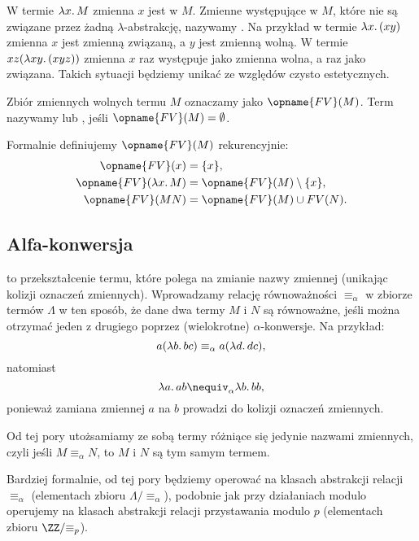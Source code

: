 \documentclass[polish,pretty]{angav}
\newcommand{\FV}{\opname{FV}}
\begin{document}
W termie $\lambda x\ldotp M$ zmienna $x$ jest  w $M$.
Zmienne występujące w $M$, które nie są związane przez żadną $\lambda$-abstrakcję, nazywamy .
Na przykład w termie $\lambda x\ldotp (x y)$ zmienna $x$ jest zmienną związaną, a $y$ jest zmienną wolną.
W termie $xz(\lambda xy\ldotp (xyz))$ zmienna $x$ raz występuje jako zmienna wolna, a raz jako związana. Takich sytuacji będziemy unikać ze względów czysto estetycznych.

Zbiór zmiennych wolnych termu $M$ oznaczamy jako $\FV(M)$.
Term nazywamy  lub , jeśli $\FV(M) = \emptyset$.

\begin{remark}
    Formalnie definiujemy $\FV(M)$ rekurencyjnie:
    \begin{align*}
        \FV(x) &= \{x\}, \\
        \FV(\lambda x\ldotp M) &= \FV(M) \setminus \{x\}, \\
        \FV(MN) &= \FV(M) \cup FV(N).
    \end{align*}
\end{remark}

\subsection{Alfa-konwersja}

 to przekształcenie termu, które polega na zmianie nazwy zmiennej (unikając kolizji oznaczeń zmiennych). Wprowadzamy relację równoważności $\equiv_\alpha$ w zbiorze termów $\Lambda$ w ten sposób, że dane dwa termy $M$ i $N$ są równoważne, jeśli można otrzymać jeden z drugiego poprzez (wielokrotne) $\alpha$-konwersje. Na przykład:
\[ a (\lambda b\ldotp bc) \equiv_\alpha a (\lambda d\ldotp dc), \]
natomiast
\[ \lambda a\ldotp ab \nequiv_\alpha \lambda b\ldotp bb, \]
ponieważ zamiana zmiennej $a$ na $b$ prowadzi do kolizji oznaczeń zmiennych.

Od tej pory utożsamiamy ze sobą termy różniące się jedynie nazwami zmiennych, czyli jeśli $M \equiv_\alpha N$, to $M$ i $N$ są tym samym termem.

\begin{remark}
    Bardziej formalnie, od tej pory będziemy operować na klasach abstrakcji relacji $\equiv_\alpha$ (elementach zbioru $\Lambda/{\equiv_\alpha}$), podobnie jak przy działaniach modulo operujemy na klasach abstrakcji relacji przystawania modulo $p$ (elementach zbioru $\ZZ/{\equiv_p}$).
\end{remark}
\end{document}
